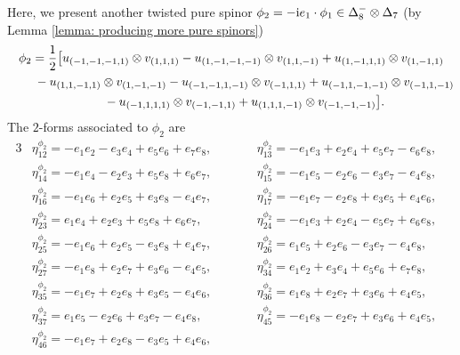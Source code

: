 \documentclass[10pt,a4paper]{amsart}
\numberwithin{equation}{section}
\begin{document}
{\allowdisplaybreaks Here, we present another twisted pure spinor $\phi_2=-{\rm i}e_1\cdot \phi_1 \in \Delta_8^-\otimes \Delta_7$ (by Lemma \ref{lemma: producing more pure spinors})
\begin{gather*}
\phi_2 ={1\over 2}\big[ u_{(-1,-1,-1,1)}\otimes v_{(1,1,1)} -u_{(1,-1,-1,-1)}\otimes v_{(1,1,-1)}
 + u_{(1,-1,1,1)}\otimes v_{(1,-1,1)} \\
 \hphantom{\phi_2 =}{} - u_{(1,1,-1,1)}\otimes v_{(1,-1,-1)} - u_{(-1,-1,1,-1)}\otimes v_{(-1,1,1)} + u_{(-1,1,-1,-1)}\otimes v_{(-1,1,-1)}\\
\hphantom{\phi_2 =}{}
 - u_{(-1,1,1,1)}\otimes v_{(-1,-1,1)} + u_{(1,1,1,-1)}\otimes v_{(-1,-1,-1)}\big].
\end{gather*}
The $2$-forms associated to $\phi_2$ are
\begin{alignat*}{3}
& \eta^{\phi_2}_{1 2} = -e_{1} e_{2} - e_{3} e_{4} + e_{5} e_{6} + e_{7} e_{8},\qquad &&
 \eta^{\phi_2}_{1 3} = -e_{1} e_{3} + e_{2} e_{4} + e_{5} e_{7} - e_{6} e_{8},&\\
& \eta^{\phi_2}_{1 4} = -e_{1} e_{4} - e_{2} e_{3} + e_{5} e_{8} + e_{6} e_{7},\qquad &&
 \eta^{\phi_2}_{1 5} = -e_{1} e_{5} - e_{2} e_{6} - e_{3} e_{7} - e_{4} e_{8},&\\
& \eta^{\phi_2}_{1 6} = -e_{1} e_{6} + e_{2} e_{5} + e_{3} e_{8} - e_{4} e_{7},\qquad &&
 \eta^{\phi_2}_{1 7} = -e_{1} e_{7} - e_{2} e_{8} + e_{3} e_{5} + e_{4} e_{6},&\\
& \eta^{\phi_2}_{2 3} = e_{1} e_{4} + e_{2} e_{3} + e_{5} e_{8} + e_{6} e_{7},\qquad &&
 \eta^{\phi_2}_{2 4} = -e_{1} e_{3} + e_{2} e_{4} - e_{5} e_{7} + e_{6} e_{8},&\\
& \eta^{\phi_2}_{2 5} = -e_{1} e_{6} + e_{2} e_{5} - e_{3} e_{8} + e_{4} e_{7},\qquad &&
 \eta^{\phi_2}_{2 6} = e_{1} e_{5} + e_{2} e_{6} - e_{3} e_{7} - e_{4} e_{8},&\\
& \eta^{\phi_2}_{2 7} = -e_{1} e_{8} + e_{2} e_{7} + e_{3} e_{6} - e_{4} e_{5},\qquad &&
 \eta^{\phi_2}_{3 4} = e_{1} e_{2} + e_{3} e_{4} + e_{5} e_{6} + e_{7} e_{8},&\\
& \eta^{\phi_2}_{3 5} = -e_{1} e_{7} + e_{2} e_{8} + e_{3} e_{5} - e_{4} e_{6},\qquad &&
 \eta^{\phi_2}_{3 6} = e_{1} e_{8} + e_{2} e_{7} + e_{3} e_{6} + e_{4} e_{5},&\\
& \eta^{\phi_2}_{3 7} = e_{1} e_{5} - e_{2} e_{6} + e_{3} e_{7} - e_{4} e_{8},\qquad &&
 \eta^{\phi_2}_{4 5} = -e_{1} e_{8} - e_{2} e_{7} + e_{3} e_{6} + e_{4} e_{5},&\\
& \eta^{\phi_2}_{4 6} = -e_{1} e_{7} + e_{2} e_{8} - e_{3} e_{5} + e_{4} e_{6},\qquad &&

\end{alignat*}}
\end{document}

